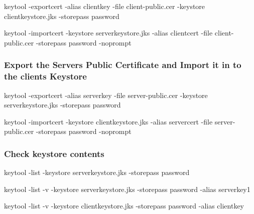 \begin{DoxyItemize}
\item keytool -\/exportcert -\/alias clientkey -\/file client-\/public.\+cer -\/keystore clientkeystore.\+jks -\/storepass password 
\item keytool -\/importcert -\/keystore serverkeystore.\+jks -\/alias clientcert -\/file client-\/public.\+cer -\/storepass password -\/noprompt 
\end{DoxyItemize}\subsubsection*{Export the Servers Public Certificate and Import it in to the clients Keystore}


\begin{DoxyItemize}
\item keytool -\/exportcert -\/alias serverkey -\/file server-\/public.\+cer -\/keystore serverkeystore.\+jks -\/storepass password 
\item keytool -\/importcert -\/keystore clientkeystore.\+jks -\/alias servercert -\/file server-\/public.\+cer -\/storepass password -\/noprompt 
\end{DoxyItemize}\subsubsection*{Check keystore contents}


\begin{DoxyItemize}
\item keytool -\/list -\/keystore serverkeystore.\+jks -\/storepass password 
\item keytool -\/list -\/v -\/keystore serverkeystore.\+jks -\/storepass password -\/alias serverkey1 
\item keytool -\/list -\/v -\/keystore clientkeystore.\+jks -\/storepass password -\/alias clientkey 
\begin{DoxyItemize}
\item 
\end{DoxyItemize}
\end{DoxyItemize}